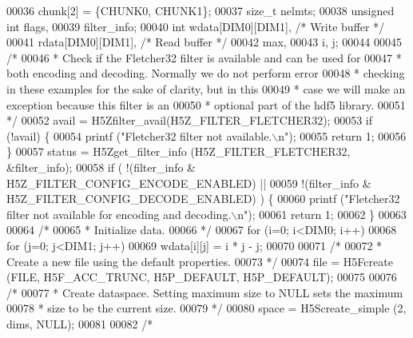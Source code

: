 \begin{DoxyCode}
00036                     chunk[2] = \{CHUNK0, CHUNK1\};
00037     \textcolor{keywordtype}{size\_t}          nelmts;
00038     \textcolor{keywordtype}{unsigned} \textcolor{keywordtype}{int}    flags,
00039                     filter\_info;
00040     \textcolor{keywordtype}{int}             wdata[DIM0][DIM1],          \textcolor{comment}{/* Write buffer */}
00041                     rdata[DIM0][DIM1],          \textcolor{comment}{/* Read buffer */}
00042                     max,
00043                     i, j;
00044 
00045     \textcolor{comment}{/*}
00046 \textcolor{comment}{     * Check if the Fletcher32 filter is available and can be used for}
00047 \textcolor{comment}{     * both encoding and decoding.  Normally we do not perform error}
00048 \textcolor{comment}{     * checking in these examples for the sake of clarity, but in this}
00049 \textcolor{comment}{     * case we will make an exception because this filter is an}
00050 \textcolor{comment}{     * optional part of the hdf5 library.}
00051 \textcolor{comment}{     */}
00052     avail = H5Zfilter\_avail(H5Z\_FILTER\_FLETCHER32);
00053     \textcolor{keywordflow}{if} (!avail) \{
00054         printf (\textcolor{stringliteral}{"Fletcher32 filter not available.\(\backslash\)n"});
00055         \textcolor{keywordflow}{return} 1;
00056     \}
00057     status = H5Zget\_filter\_info (H5Z\_FILTER\_FLETCHER32, &filter\_info);
00058     \textcolor{keywordflow}{if} ( !(filter\_info & H5Z\_FILTER\_CONFIG\_ENCODE\_ENABLED) ||
00059                 !(filter\_info & H5Z\_FILTER\_CONFIG\_DECODE\_ENABLED) ) \{
00060         printf (\textcolor{stringliteral}{"Fletcher32 filter not available for encoding and decoding.\(\backslash\)n"});
00061         \textcolor{keywordflow}{return} 1;
00062     \}
00063 
00064     \textcolor{comment}{/*}
00065 \textcolor{comment}{     * Initialize data.}
00066 \textcolor{comment}{     */}
00067     \textcolor{keywordflow}{for} (i=0; i<DIM0; i++)
00068         \textcolor{keywordflow}{for} (j=0; j<DIM1; j++)
00069             wdata[i][j] = i * j - j;
00070 
00071     \textcolor{comment}{/*}
00072 \textcolor{comment}{     * Create a new file using the default properties.}
00073 \textcolor{comment}{     */}
00074     file = H5Fcreate (FILE, H5F\_ACC\_TRUNC, H5P\_DEFAULT, H5P\_DEFAULT);
00075 
00076     \textcolor{comment}{/*}
00077 \textcolor{comment}{     * Create dataspace.  Setting maximum size to NULL sets the maximum}
00078 \textcolor{comment}{     * size to be the current size.}
00079 \textcolor{comment}{     */}
00080     space = H5Screate\_simple (2, dims, NULL);
00081 
00082     \textcolor{comment}{/*}

\end{DoxyCode}
